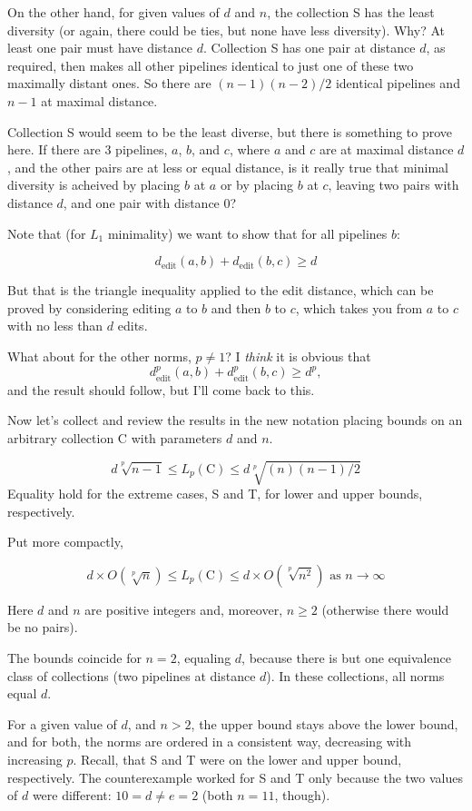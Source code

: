\documentclass{article}
\begin{document}
On the other hand, for given values of $d$ and $n$, the collection S
has the least diversity (or again, there could be ties, but none have
less diversity).  Why?  At least one pair must have distance $d$.
Collection S has one pair at distance $d$, as required, then makes all
other pipelines identical to just one of these two maximally distant
ones.  So there are $(n-1)(n-2)/2$ identical pipelines and $n-1$ at
maximal distance.

Collection S would seem to be the least diverse, but there is
something to prove here.  If there are 3 pipelines, $a$, $b$, and $c$,
where $a$ and $c$ are at maximal distance $d$, and the other pairs are
at less or equal distance, is it really true that minimal diversity is
acheived by placing $b$ at $a$ or by placing $b$ at $c$, leaving two
pairs with distance $d$, and one pair with distance 0?

Note that (for $L_1$ minimality) we want to show that for all
pipelines $b$:

$$d_{\mbox{edit}}(a, b) + d_{\mbox{edit}}(b, c) \geq d$$

But that is the triangle inequality applied to the edit distance,
which can be proved by considering editing $a$ to $b$ and then $b$ to
$c$, which takes you from $a$ to $c$ with no less than $d$ edits.

What about for the other norms, $p \neq 1$?  I \emph{think} it is
obvious that
$$d^p_{\mbox{edit}}(a, b) + d^p_{\mbox{edit}}(b, c) \geq d^p,$$ and
the result should follow, but I'll come back to this.

Now let's collect and review the results in the new notation placing
bounds on an arbitrary collection C with parameters $d$ and $n$.

$$ d \sqrt[p]{n-1} \leq L_p(\mbox{C}) \leq d \sqrt[p]{(n)(n-1)/2} $$
Equality hold for the extreme cases, S and T, for lower and upper
bounds, respectively.

Put more compactly,

$$d \times O\left(\sqrt[p]{n}\right) \leq L_p(\mbox{C}) \leq d \times
O\left(\sqrt[p]{n^2}\right) \mbox{ as } n \rightarrow \infty$$

Here $d$ and $n$ are positive integers and, moreover, $n \geq 2$
(otherwise there would be no pairs).

The bounds coincide for $n=2$, equaling $d$, because there is but one
equivalence class of collections (two pipelines at distance $d$).  In
these collections, all norms equal $d$.

For a given value of $d$, and $n > 2$, the upper bound stays above the
lower bound, and for both, the norms are ordered in a consistent way,
decreasing with increasing $p$.  Recall, that S and T were on the
lower and upper bound, respectively.  The counterexample worked for S
and T only because the two values of $d$ were different: $10 = d \neq
e = 2$ (both $n = 11$, though).
\end{document}
